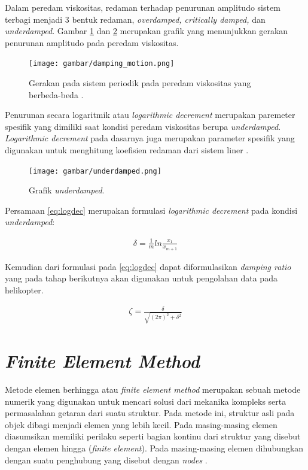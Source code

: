 Dalam peredam viskositas, redaman terhadap penurunan amplitudo sistem terbagi menjadi 3 bentuk redaman, \textit{overdamped, critically damped,} dan \textit{underdamped}. Gambar \ref{fig:damping_motion} dan \ref{fig:underdamped} merupakan grafik yang menunjukkan gerakan penurunan amplitudo pada peredam viskositas. 

\begin{figure}[H]
	\centering
	\texttt{[image: gambar/damping\_motion.png]}
	\caption{Gerakan pada sistem periodik pada peredam viskositas yang berbeda-beda \cite{rao2004mechanical}.}
	\label{fig:damping_motion}
\end{figure}

Penurunan secara logaritmik atau \textit{logarithmic decrement} merupakan paremeter spesifik yang dimiliki saat kondisi peredam viskositas berupa \textit{underdamped}. \textit{Logarithmic decrement} pada dasarnya juga merupakan parameter spesifik yang digunakan untuk menghitung koefisien redaman dari sistem liner \cite{Lojewski2020InfluenceOC}. 

\begin{figure}[H]
	\centering
	\texttt{[image: gambar/underdamped.png]}
	\caption{Grafik \textit{underdamped}.}
	\label{fig:underdamped}
\end{figure}

Persamaan \ref{eq:logdec} merupakan formulasi \textit{logarithmic decrement} pada kondisi \textit{underdamped}:

\begin{align}
	\delta = \frac{1}{m}ln\frac{x_1}{x_{m+1}}
	\label{eq:logdec}
\end{align}

Kemudian dari formulasi pada \ref{eq:logdec} dapat diformulasikan \textit{damping ratio} yang pada tahap berikutnya akan digunakan untuk pengolahan data pada helikopter.

\begin{align}
	\zeta=\frac{\delta}{\sqrt{\left( 2\pi \right)^2+\delta^2}}
\end{align}


\section{\textit{Finite Element Method}}

Metode elemen berhingga atau \textit{finite element method} merupakan sebuah metode numerik yang digunakan untuk mencari solusi dari mekanika kompleks serta permasalahan getaran dari suatu struktur. Pada metode ini, struktur asli pada objek dibagi menjadi elemen yang lebih kecil. Pada masing-masing elemen diasumsikan memiliki perilaku seperti bagian kontinu dari struktur yang disebut dengan elemen hingga (\textit{finite element}). Pada masing-masing elemen dihubungkan dengan suatu penghubung yang disebut dengan \textit{nodes} \cite{Lojewski2020InfluenceOC}.

